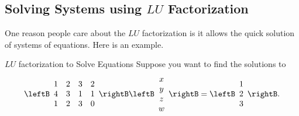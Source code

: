 \subsection{Solving Systems using $LU$ Factorization}

One reason people care about the $LU$ factorization
 is it allows the quick solution of
systems of equations. Here is an example.

\begin{example}{$LU$ factorization to Solve Equations}{}
Suppose you want to find the solutions to
\begin{equation*}
\leftB
\begin{array}{rrrr}
1 & 2 & 3 & 2 \\
4 & 3 & 1 & 1 \\
1 & 2 & 3 & 0
\end{array}
\rightB \leftB
\begin{array}{c}
x \\
y \\
z \\
w
\end{array}
\rightB =\leftB
\begin{array}{c}
1 \\
2 \\
3
\end{array}
\rightB .
\end{equation*}
\end{example}

